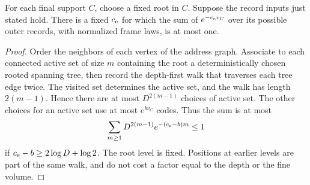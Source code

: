 \documentclass[11pt,letterpaper,reqno]{amsart}
\makeatletter
\numberwithin{equation}{section}
\theoremstyle{definition}
\newcommand{\ms@minorstart}{%
  \pushQED{\qed}\renewcommand{\qedsymbol}{$\blacksquare$}}
\newenvironment{lemma}[1][]{\ms@minorstart\ms@lemma[#1]}
  {\popQED\endms@lemma}
\theoremstyle{remark}
\makeatother
\begin{document}
\begin{lemma}[Rooted record count]\label{rt:lem-history-code}
For each final support \(C\), choose a fixed root in \(C\).
Suppose the record inputs just stated hold. There is a fixed
\(c_{\rm e}\) for which the sum of \(e^{-c_{\rm e}v_C}\) over
its possible outer records, with normalized frame laws, is
at most one.
\end{lemma}
\begin{proof}
Order the neighbors of each vertex of the address graph.
Associate to each connected active set of size \(m\) containing
the root a deterministically chosen rooted spanning tree, then
record the depth-first walk that traverses each tree edge twice.
The visited set determines the active set, and the walk has
length \(2(m-1)\). Hence there are at most \(D^{2(m-1)}\)
choices of active set. The other choices for an active set
use at most \(e^{b v_C}\) codes. Thus the sum
is at most
\[
   \sum_{m\ge1}D^{2(m-1)}e^{-(c_{\rm e}-b)m}\le 1
\]
if \(c_{\rm e}-b\ge 2\log D+\log2\).
The root level is fixed. Positions at earlier levels are
part of the same walk, and do not cost a factor equal to
the depth or the fine volume.
\end{proof}
\end{document}
